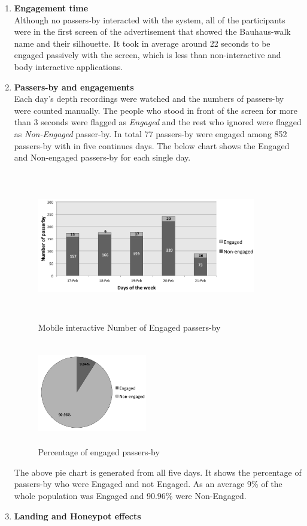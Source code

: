 \begin{enumerate}
\newpage
\item \textbf{Engagement time} \\
Although no passers-by interacted with the system, all of the participants were in the first screen of the advertisement that showed the Bauhaus-walk name and their silhouette. It took in average around 22 seconds to be engaged passively with the screen, which is less than non-interactive and body interactive applications. 


\item \textbf{Passers-by and engagements} \\
Each day’s depth recordings were watched and the numbers of passers-by were counted manually. The people who stood in front of the screen for more than 3 seconds were flagged as \emph{Engaged} and the rest who ignored were flagged as \emph{Non-Engaged} passer-by. In total 77 passers-by were engaged among 852 passers-by with in five continues days. The below chart shows the Engaged and Non-engaged passers-by for each single day.
\begin{figure}[H]
    \centering
    \includegraphics[width=0.9\textwidth,height=6.5cm]{Figures/8/mobile_inter_findings/mobile_inter_engage_day}
    \caption{Mobile interactive Number of Engaged passers-by}%
    \label{fig:mobileengagedandengagedby}%
\end{figure}


\begin{figure}[H]
    \centering
    \includegraphics[width=0.45\textwidth,height=4.5cm]{Figures/8/mobile_inter_findings/mobile_eng_percentage}
    \caption{Percentage of engaged passers-by}%
    \label{fig:mobileengagedpasserbypercentage}%
\end{figure}

The above pie chart is generated from all five days. It shows the percentage of passers-by who were Engaged and not Engaged. As an average 9\% of the whole population was Engaged and 90.96\% were Non-Engaged.

\item \textbf{Landing and Honeypot effects}
\end{enumerate}

